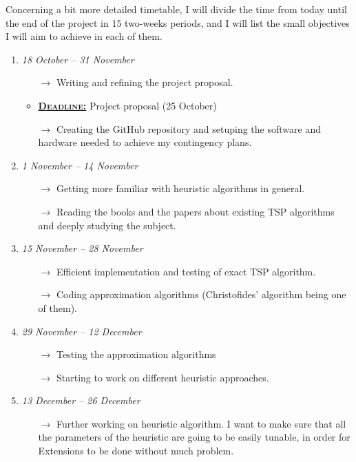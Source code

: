 Concerning a bit more detailed timetable, I will divide the time from today until the end of the project in 15 two-weeks periods, and I will list the small objectives I will aim to achieve in each of them.
\begin{enumerate}[label=\bf Part \arabic*:]
    \item \emph{18 October -- 31 November}
        \begin{itemize}
            \item[$\rightarrow$] Writing and refining the project proposal.
            \item \underline{\textbf{\textsc{Deadline:}}} Project proposal (25 October)
            \item[$\rightarrow$] Creating the GitHub repository and setuping the software and hardware needed to achieve my contingency plans.
        \end{itemize}
    \item \emph{1 November -- 14 November}
        \begin{itemize}
        	\item[$\rightarrow$] Getting more familiar with heuristic algorithms in general.
            \item[$\rightarrow$] Reading the books and the papers about existing TSP algorithms and deeply studying the subject.
        \end{itemize}
    \item \emph{15 November -- 28 November}
        \begin{itemize}
            \item[$\rightarrow$] Efficient implementation and testing of  exact TSP algorithm.
            \item[$\rightarrow$] Coding approximation algorithms (Christofides' algorithm being one of them).
        \end{itemize}
    \item \emph{29 November -- 12 December}
        \begin{itemize}
            \item[$\rightarrow$] Testing the approximation algorithms
            \item[$\rightarrow$] Starting to work on different heuristic approaches.
        \end{itemize}
    \item \emph{13 December -- 26 December}
        \begin{itemize}
            \item[$\rightarrow$] Further working on heuristic algorithm. I want to make sure that all the parameters of the heuristic are going to be easily tunable, in order for Extensions to be done without much problem.

\end{itemize}
\end{enumerate}
